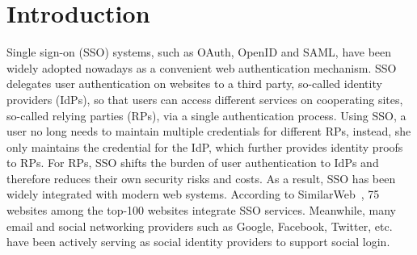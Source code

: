 \section{Introduction}
\label{sec:intro}




Single sign-on (SSO) systems, such as OAuth, OpenID and SAML, have been widely adopted nowadays as a convenient web authentication mechanism. SSO delegates user authentication on websites to a third party, so-called identity providers (IdPs), so that users can access different services on cooperating sites, so-called relying parties (RPs), via a single authentication process. Using SSO, a user no long needs to maintain multiple credentials for different RPs, instead, she only maintains the credential for the IdP, which further provides identity proofs to RPs.
For RPs, SSO shifts the burden of user authentication to IdPs and therefore reduces their own security risks and costs. As a result, SSO has been widely integrated with modern web systems.
According to SimilarWeb~\cite{similarweb}, 75 websites among the top-100 websites integrate SSO services. Meanwhile, many email and social networking providers such as Google, Facebook, Twitter, etc. have been actively serving as social identity providers to support social login.


